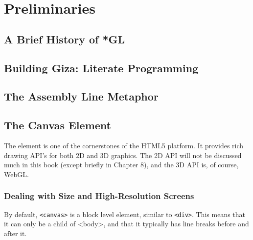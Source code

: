 \chapter{Preliminaries}

\section{A Brief History of *GL}

\section{Building Giza: Literate Programming}

\section{The Assembly Line Metaphor}

\section{The Canvas Element}


The \texttt{} element is one of the cornerstones of the HTML5 platform.  It provides rich drawing API's for both 2D and 3D graphics.  The 2D API will not be discussed much in this book (except briefly in Chapter 8), and the 3D API is, of course, WebGL.

\subsection{Dealing with Size and High-Resolution Screens}

By default, \texttt{<canvas>} is a block level element, similar to \texttt{<div>}.  This means that it can only be a child of <body>, and that it typically has line breaks before and after it.

